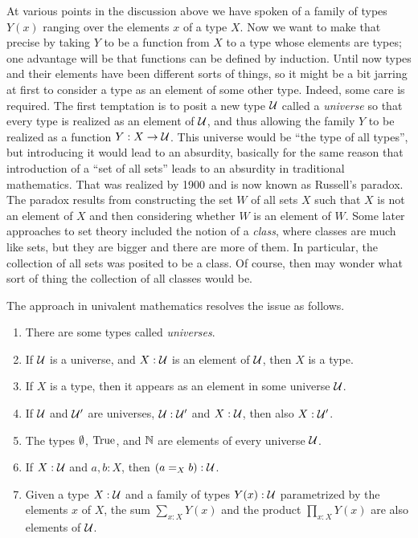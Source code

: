 At various points in the discussion above we have spoken of a family of types $Y(x)$ ranging over the elements $x$ of a type $X$.  Now we want
to make that precise by taking $Y$ to be a function from $X$ to a type whose elements are types; one advantage will be that functions can be
defined by induction.  Until now types and their elements have been different sorts of things, so it might be a bit jarring at first to consider
a type as an element of some other type. Indeed, some care is required.  The first temptation is to posit a new type ${\mathcal{U}}$ called a {\em
  universe} so that every type is realized as an element of ${\mathcal{U}}$, and thus allowing the family $Y$ to be realized as a function $Y : X \to
{\mathcal{U}}$.  This universe would be ``the type of all types'', but introducing it would lead to an absurdity, basically for the same reason that
introduction of a ``set of all sets'' leads to an absurdity in traditional mathematics.  That was realized by 1900 and is now known as Russell's
paradox.  The paradox results from constructing the set $W$ of all sets $X$ such that $X$ is not an element of $X$ and then considering whether
$W$ is an element of $W$.  Some later approaches to set theory included the notion of a {\em class}, where classes are much like sets, but they
are bigger and there are more of them.  In particular, the collection of all sets was posited to be a class.  Of course, then may wonder what
sort of thing the collection of all classes would be.

The approach in univalent mathematics resolves the issue as follows.

\begin{enumerate}
\item There are some types called {\em universes}.
\item If ${\mathcal{U}}$ is a universe, and $X : {\mathcal{U}}$ is an element of ${\mathcal{U}}$, then $X$ is a type.
\item If $X$ is a type, then it appears as an element in some universe ${\mathcal{U}}$.
\item If ${\mathcal{U}}$ and ${\mathcal{U}}'$ are universes, ${\mathcal{U}}:{\mathcal{U}}'$ and $X:{\mathcal{U}}$, then also $X:{\mathcal{U}}'$.
\item The types $\emptyset$, $\mathrm{True}$, and $\mathbb{N}$ are elements of every universe ${\mathcal{U}}$.
\item If $X : {\mathcal{U}}$ and $a,b:X$, then $(a = _X b) : {\mathcal{U}}$.  
\item Given a type $X:{\mathcal{U}}$ and a family of types $Y(x):{\mathcal{U}}$ parametrized by the elements $x$ of $X$, the sum $\sum_{x:X} Y(x)$ and the product
  $\prod_{x:X} Y(x)$ are also elements of ${\mathcal{U}}$.
\end{enumerate}

